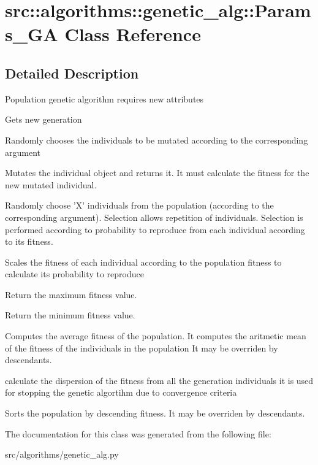 \hypertarget{classsrc_1_1algorithms_1_1genetic__alg_1_1Params__GA}{
\section{src::algorithms::genetic\_\-alg::Params\_\-GA Class Reference}
\label{classsrc_1_1algorithms_1_1genetic__alg_1_1Params__GA}
}


\subsection{Detailed Description}
\begin{DoxyVerb}
    Population genetic algorithm requires new attributes
    \end{DoxyVerb}
 \begin{DoxyVerb}
    Gets new generation
    \end{DoxyVerb}
 \begin{DoxyVerb}
    Randomly chooses the individuals to be mutated according to the corresponding
    argument
    \end{DoxyVerb}
 \begin{DoxyVerb}
    Mutates the individual object and returns it.
    It must calculate the fitness for the new mutated individual.
    \end{DoxyVerb}
 \begin{DoxyVerb}
    Randomly choose 'X' individuals from the population (according to the corresponding argument).
    Selection allows repetition of individuals. Selection is performed according to probability
    to reproduce from each individual according to its fitness.
    \end{DoxyVerb}
 \begin{DoxyVerb}
    Scales the fitness of each individual according to the population fitness
    to calculate its probability to reproduce
    \end{DoxyVerb}
 \begin{DoxyVerb}
    Return the maximum fitness value.
    \end{DoxyVerb}
 \begin{DoxyVerb}
    Return the minimum fitness value.
    \end{DoxyVerb}
 \begin{DoxyVerb}
    Computes the average fitness of the population.
    It computes the aritmetic mean of the fitness of the individuals in the population
    It may be overriden by descendants.
    \end{DoxyVerb}
 \begin{DoxyVerb}
    calculate the dispersion of the fitness from all the generation individuals
    it is used for stopping the genetic algortihm due to convergence criteria
    \end{DoxyVerb}
 \begin{DoxyVerb}
    Sorts the population by descending fitness.
    It may be overriden by descendants.
    \end{DoxyVerb}
 

The documentation for this class was generated from the following file:\begin{DoxyCompactItemize}
\item 
src/algorithms/genetic\_\-alg.py\end{DoxyCompactItemize}

